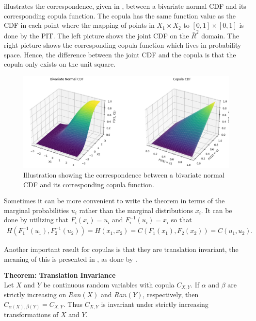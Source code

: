  illustrates the correspondence, given in , between a bivariate normal \gls{CDF} and its corresponding copula function. The copula has the same function value as the \gls{CDF} in each point where the mapping of points in $X_1\times X_2$ to $[0,1]\times[0,1]$ is done by the \gls{PIT}. The left picture shows the joint \gls{CDF} on the $\bar{R}^2$ domain. The right picture shows the corresponding copula function which lives in probability space. Hence, the difference between the joint \gls{CDF} and the copula is that the copula only exists on the unit square. 

\begin{figure}
    \centering
    \includegraphics[width=1\linewidth]{3Theory/pictures/Copula.png}
    \caption{Illustration showing the correspondence between a bivariate normal \gls{CDF} and its corresponding copula function.}
    \label{fig:CDFtoCopula}
\end{figure}

Sometimes it can be more convenient to write the  theorem in terms of the marginal probabilities $u_i$ rather than the marginal distributions $x_i$. It can be done by utilizing that $F_i(x_i) = u_i$ and $F_i^{-1}(u_i)= x_i$ so that 
\begin{align*}
    H(F_1^{-1}(u_1),F_2^{-1}(u_2))=H(x_1,x_2) = C(F_1(x_1), F_2(x_2))= C(u_1, u_2).
\end{align*}

Another important result for copulas is that they are translation invariant, the meaning of this is presented in , as done by \citet[p.~25]{Nelsen2006}.

\begin{theorem}\label{the:TranslationInvariance}
        \textbf{Theorem: Translation Invariance}\\
        Let $X$ and $Y$ be continuous random variables with copula $C_{X, Y}$. If $\alpha$ and $\beta$ are strictly increasing on $Ran(X)$ and $Ran(Y)$, respectively, then $C_{\alpha(X),\beta(Y)}  = C_{X,Y}$. Thus $C_{X, Y}$ is invariant under strictly increasing transformations of $X$ and $Y$.
\end{theorem}

